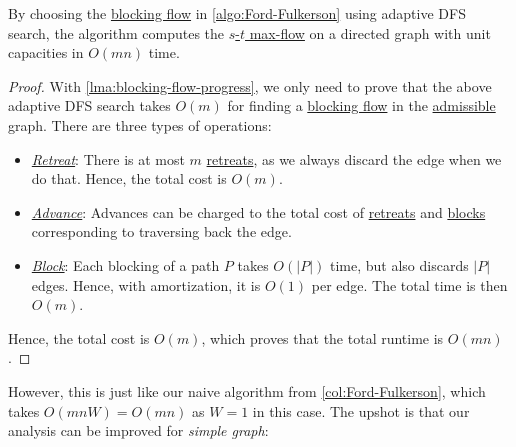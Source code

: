 \begin{theorem}\label{thm:Ford-Fulkerson-blocking-flow-unit}
	By choosing the \hyperref[def:blocking-flow]{blocking flow} in \autoref{algo:Ford-Fulkerson} using adaptive DFS search, the algorithm computes the \hyperref[prb:s-t-max-flow]{\(s\)-\(t\) max-flow} on a directed graph with unit capacities in \(O(mn)\) time.
\end{theorem}
\begin{proof}
	With \autoref{lma:blocking-flow-progress}, we only need to prove that the above adaptive DFS search takes \(O(m)\) for finding a \hyperref[def:blocking-flow]{blocking flow} in the \hyperref[def:admissible]{admissible} graph. There are three types of operations:
	\begin{itemize}
		\item \hyperref[algo:unit-adaptive-DFS-retreat]{\emph{Retreat}}: There is at most \(m\) \hyperref[algo:unit-adaptive-DFS-retreat]{retreats}, as we always discard the edge when we do that. Hence, the total cost is \(O(m)\).
		\item \hyperref[algo:unit-adaptive-DFS-advance]{\emph{Advance}}: Advances can be charged to the total cost of \hyperref[algo:unit-adaptive-DFS-retreat]{retreats} and \hyperref[algo:unit-adaptive-DFS-block]{blocks} corresponding to traversing back the edge.
		\item \hyperref[algo:unit-adaptive-DFS-block]{\emph{Block}}: Each blocking of a path \(P\) takes \(O(\lvert P \rvert )\) time, but also discards \(\lvert P \rvert \) edges. Hence, with amortization, it is \(O(1)\) per edge. The total time is then \(O(m)\).
	\end{itemize}
	Hence, the total cost is \(O(m)\), which proves that the total runtime is \(O(mn)\).
\end{proof}

However, this is just like our naive algorithm from \autoref{col:Ford-Fulkerson}, which takes \(O(mnW) = O(mn)\) as \(W = 1\) in this case. The upshot is that our analysis can be improved for \emph{simple graph}:

